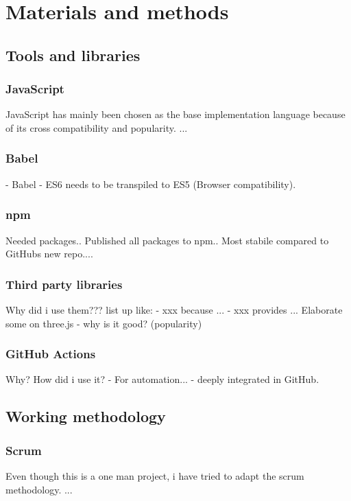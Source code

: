 \chapter[Method]{Materials and methods}



\section{Tools and libraries}
\subsection{JavaScript}
JavaScript has mainly been chosen as the base implementation language because of its cross compatibility and popularity. ...

\subsection{Babel}
- Babel - ES6 needs to be transpiled to ES5 (Browser compatibility).
\subsection{npm}
Needed packages.. Published all packages to npm.. Most stabile compared to GitHubs new repo....

\subsection{Third party libraries}
Why did i use them???
list up like:
- xxx because ...
- xxx provides ...
Elaborate some on three.js - why is it good? (popularity)

\subsection{GitHub Actions}
Why? How did i use it? - For automation... - deeply integrated in GitHub.

\section{Working methodology}
\subsection{Scrum}
Even though this is a one man project, i have tried to adapt the scrum methodology.
...


